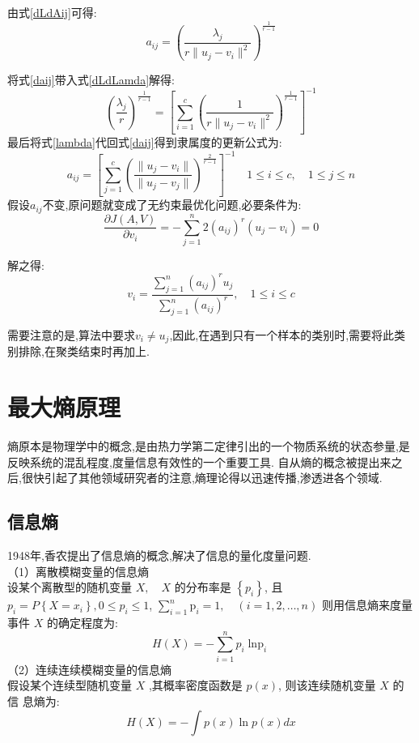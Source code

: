 由式\ref{dLdAij}可得:
\begin{equation}
    a_{i j}=\left( \frac{\lambda_j}{r \|u_{j}-v_{i}\|^2} \right)^{\frac{1}{r-1}}
    \label{daij}
\end{equation}

将式\ref{daij}带入式\ref{dLdLamda}解得:
\begin{equation}
    \left(\frac{\lambda_j}{r}\right)^{\frac{1}{r-1}}=\left[\sum\limits_{i=1}^c( \frac{1}{r \|u_{j}-v_{i}\|^2})^{\frac{1}{r-1}} \right]^{-1}
    \label{lambda}
\end{equation}
最后将式\ref{lambda}代回式\ref{daij}得到隶属度的更新公式为:
\begin{equation}
    a_{i j}=\left[\sum\limits_{j=1}^c\left( \frac{\|u_{j}-v_{i}\|}{\|u_{j}-v_{j}\|} \right)^{\frac{2}{r-1}}\right]^{-1}
    \quad 1 \leqslant i \leqslant c,\quad 1 \leqslant j \leqslant n
    \label{aij}
\end{equation}
假设$a_{i j}$不变,原问题就变成了无约束最优化问题,必要条件为:
\begin{equation}
        \frac{\partial J(A, V)}{\partial v_{i}}=-\sum_{j=1}^{n} 2\left(a_{i j}\right)^{r}\left(u_{j}-v_{i}\right)=0 
\end{equation}

解之得:
\begin{equation}
    v_{i}=\frac{\sum\limits_{j=1}^{n}\left(a_{i j}\right)^{r} u_{j}}{\sum\limits_{j=1}^{n}\left(a_{i j}\right)^{r}}, \quad 1 \leqslant i \leqslant c
    \label{vij}
\end{equation}
\par
需要注意的是,算法中要求$v_i \neq  u_j$,因此,在遇到只有一个样本的类别时,需要将此类别排除,在聚类结束时再加上.
\section{最大熵原理}
熵原本是物理学中的概念,是由热力学第二定律引出的一个物质系统的状态参量,是反映系统的混乱程度,度量信息有效性的一个重要工具.
自从熵的概念被提出来之后,很快引起了其他领域研究者的注意,熵理论得以迅速传播,渗透进各个领域.
\subsection{信息熵}
1948年,香农\cite{1948A}提出了信息熵的概念,解决了信息的量化度量问题.\\
（1）离散模糊变量的信息熵\\
设某个离散型的随机变量 $X, \quad X$ 的分布率是 $\left\{p_{i}\right\}$, 且 $p_{i}=P\left\{X=x_{i}\right\}, 0 \leq p_{i} \leq 1$,
$\sum_{i=1}^n \mathrm{p}_i=1, \quad(i=1,2 ,\dots, n)$ 则用信息熵来度量事件 $X$ 的确定程度为:
\begin{equation}
    H(X) =-\sum_{i=1}^{n} p_{i} \operatorname{\ln p}_{i}
\end{equation}
（2）连续连续模糊变量的信息熵\\
假设某个连续型随机变量 $X$ ,其概率密度函数是 $p(x)$, 则该连续随机变量 $X$ 的信
息熵为:
\begin{equation}
    H(X)=-\int p(x) \ln p(x) d x
\end{equation}

